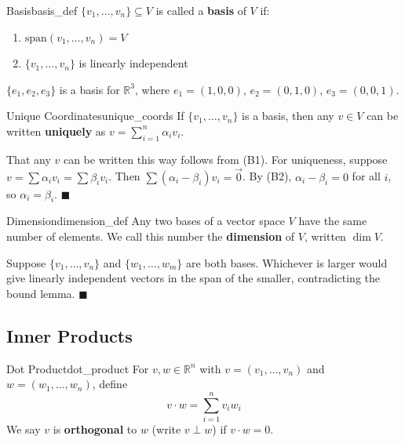 \documentclass[11pt, letterpaper, openany]{book}
\renewenvironment{proof}[1][\proofname]{%
  \tcolorbox[blanker, breakable, left=1em,
    before skip=1em, after skip=1em,
    borderline west={2pt}{0pt}{MagicTeal!50},
    colback=MagicCream,
    before upper={\textcolor{MagicTeal}{\sffamily\bfseries #1.}\space}
  ]%
}{%
  \hfill\textcolor{MagicTeal}{\ensuremath{\blacksquare}}\endtcolorbox%
}
\begin{document}
\begin{defn}{Basis}{basis_def}
$\{v_1, \ldots, v_n\} \subseteq V$ is called a \textbf{basis} of $V$ if:
\begin{enumerate}
    \item[(B1)] $\text{span}(v_1, \ldots, v_n) = V$
    \item[(B2)] $\{v_1, \ldots, v_n\}$ is linearly independent
\end{enumerate}
\end{defn}

\begin{example}
$\{e_1, e_2, e_3\}$ is a basis for $\mathbb{R}^3$, where $e_1 = (1,0,0)$, $e_2 = (0,1,0)$, $e_3 = (0,0,1)$.
\end{example}

\begin{lem}{Unique Coordinates}{unique_coords}
If $\{v_1, \ldots, v_n\}$ is a basis, then any $v \in V$ can be written \textbf{uniquely} as $v = \sum_{i=1}^n \alpha_i v_i$.
\end{lem}

\begin{proof}
That any $v$ can be written this way follows from (B1). For uniqueness, suppose $v = \sum \alpha_i v_i = \sum \beta_i v_i$. Then $\sum(\alpha_i - \beta_i) v_i = \vec{0}$. By (B2), $\alpha_i - \beta_i = 0$ for all $i$, so $\alpha_i = \beta_i$.
\end{proof}

\begin{defn}{Dimension}{dimension_def}
Any two bases of a vector space $V$ have the same number of elements. We call this number the \textbf{dimension} of $V$, written $\dim V$.
\end{defn}

\begin{proof}[Proof that dimension is well-defined]
Suppose $\{v_1, \ldots, v_n\}$ and $\{w_1, \ldots, w_m\}$ are both bases. Whichever is larger would give linearly independent vectors in the span of the smaller, contradicting the bound lemma.
\end{proof}

\subsection{Inner Products}

\begin{defn}{Dot Product}{dot_product}
For $v, w \in \mathbb{R}^n$ with $v = (v_1, \ldots, v_n)$ and $w = (w_1, \ldots, w_n)$, define
\[v \cdot w = \sum_{i=1}^n v_i w_i\]
We say $v$ is \textbf{orthogonal} to $w$ (write $v \perp w$) if $v \cdot w = 0$.
\end{defn}
\end{document}
